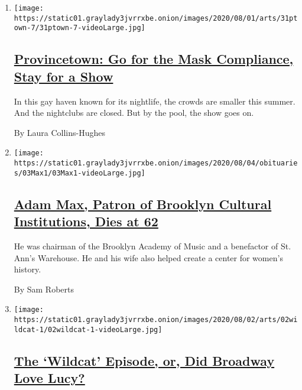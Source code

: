 \begin{enumerate}
\def\labelenumi{\arabic{enumi}.}
\item
  \texttt{[image: https://static01.graylady3jvrrxbe.onion/images/2020/08/01/arts/31ptown-7/31ptown-7-videoLarge.jpg]}

  \hypertarget{provincetown-go-for-the-mask-compliance-stay-for-a-show}{%
  \subsection{\texorpdfstring{\href{/2020/07/31/theater/provincetown-nightlife-coronavirus.html}{Provincetown:
  Go for the Mask Compliance, Stay for a
  Show}}{Provincetown: Go for the Mask Compliance, Stay for a Show}}\label{provincetown-go-for-the-mask-compliance-stay-for-a-show}}

  In this gay haven known for its nightlife, the crowds are smaller this
  summer. And the nightclubs are closed. But by the pool, the show goes
  on.

  By Laura Collins-Hughes
\item
  \texttt{[image: https://static01.graylady3jvrrxbe.onion/images/2020/08/04/obituaries/03Max1/03Max1-videoLarge.jpg]}

  \hypertarget{adam-max-patron-of-brooklyn-cultural-institutions-dies-at-62}{%
  \subsection{\texorpdfstring{\href{/2020/08/03/arts/adam-max-patron-of-brooklyn-cultural-institutions-dies-at-62.html}{Adam
  Max, Patron of Brooklyn Cultural Institutions, Dies at
  62}}{Adam Max, Patron of Brooklyn Cultural Institutions, Dies at 62}}\label{adam-max-patron-of-brooklyn-cultural-institutions-dies-at-62}}

  He was chairman of the Brooklyn Academy of Music and a benefactor of
  St. Ann's Warehouse. He and his wife also helped create a center for
  women's history.

  By Sam Roberts
\item
  \texttt{[image: https://static01.graylady3jvrrxbe.onion/images/2020/08/02/arts/02wildcat-1/02wildcat-1-videoLarge.jpg]}

  \hypertarget{the-wildcat-episode-or-did-broadway-love-lucy}{%
  \subsection{\texorpdfstring{\href{/2020/07/31/theater/lucille-ball-wildcat.html}{The
  `Wildcat' Episode, or, Did Broadway Love
  Lucy?}}{The `Wildcat' Episode, or, Did Broadway Love Lucy?}}\label{the-wildcat-episode-or-did-broadway-love-lucy}}


\end{enumerate}
